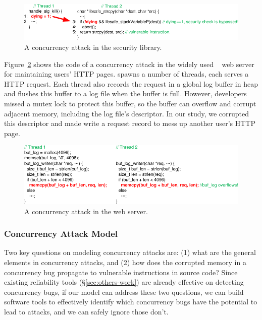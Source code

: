 \begin{figure}[h]
\vspace{-.1in}
\centering
\includegraphics[width=0.8\columnwidth]{figures/libsafe}
\vspace{-.1in}
\caption{{A concurrency attack in the \libsafe security library.}} 
\label{fig:libsafe}
\vspace{-.15in}
\end{figure}

Figure~\ref{fig:apache} shows the code of a concurrency attack in 
the widely used \apache~\cite{apache} web server for maintaining users' HTTP 
pages. \apache spawns a number of threads, each serves a HTTP request. Each 
thread also records the request in a global log buffer in heap and flushes this 
buffer to a log file when the buffer is full. However, developers missed a 
mutex lock to protect this buffer, so the buffer can overflow and corrupt 
adjacent memory, including the log file's descriptor. In our study, we 
corrupted this descriptor and made \apache write a request record to mess up 
another user's HTTP page.

\begin{figure}[h]
\vspace{-.05in}
\centering
\includegraphics[width=0.8\columnwidth]{figures/apache}
\vspace{-.1in}
\caption{{A concurrency attack in the \apache web server.}} \label{fig:apache}
\vspace{-.15in}
\end{figure}



\vspace{-.15in}\subsubsection{Concurrency Attack Model} 
\label{sec:attack-phase}\vspace{-.075in}

Two key questions on modeling concurrency attacks are: (1) what are the general 
elements in concurrency attacks, and (2) how does the corrupted memory in a 
concurrency bug propagate to vulnerable instructions in source code? Since 
existing reliability tools (\S\ref{sec:others-work}) are already effective on 
detecting concurrency bugs, if our model can address these two questions, we 
can build software tools to effectively identify which concurrency bugs have 
the potential to lead to attacks, and we can safely ignore those don't.

